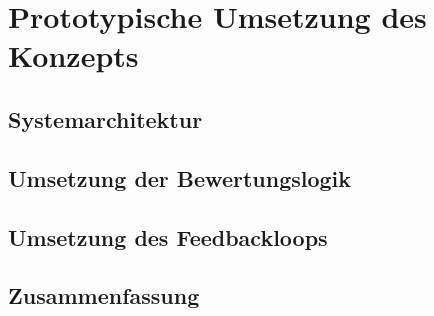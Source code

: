 \chapter{Prototypische Umsetzung des Konzepts}\label{ch:Implementierung}


\section{Systemarchitektur}


\section{Umsetzung der Bewertungslogik}


\section{Umsetzung des Feedbackloops}


\section{Zusammenfassung}

